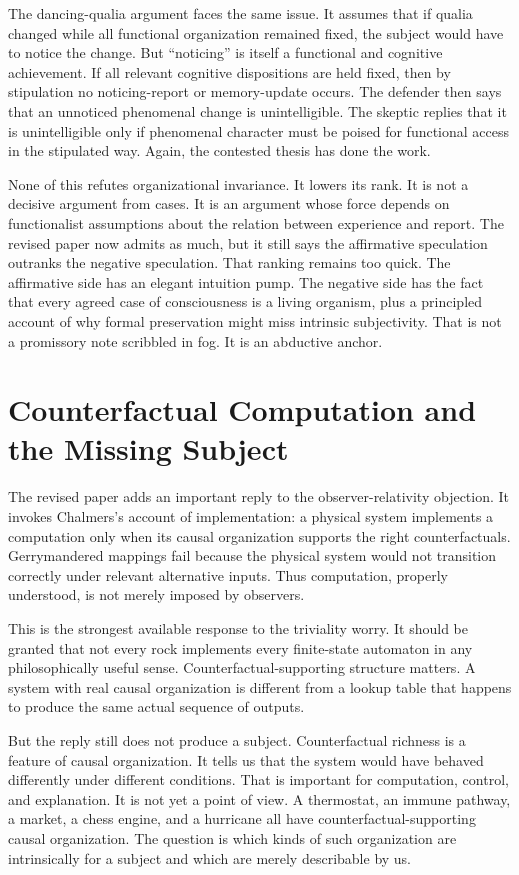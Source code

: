 \documentclass[11pt]{article}
\begin{document}
The dancing-qualia argument faces the same issue. It assumes that if qualia changed while all functional organization remained fixed, the subject would have to notice the change. But ``noticing'' is itself a functional and cognitive achievement. If all relevant cognitive dispositions are held fixed, then by stipulation no noticing-report or memory-update occurs. The defender then says that an unnoticed phenomenal change is unintelligible. The skeptic replies that it is unintelligible only if phenomenal character must be poised for functional access in the stipulated way. Again, the contested thesis has done the work.

None of this refutes organizational invariance. It lowers its rank. It is not a decisive argument from cases. It is an argument whose force depends on functionalist assumptions about the relation between experience and report. The revised paper now admits as much, but it still says the affirmative speculation outranks the negative speculation. That ranking remains too quick. The affirmative side has an elegant intuition pump. The negative side has the fact that every agreed case of consciousness is a living organism, plus a principled account of why formal preservation might miss intrinsic subjectivity. That is not a promissory note scribbled in fog. It is an abductive anchor.

\section{Counterfactual Computation and the Missing Subject}

The revised paper adds an important reply to the observer-relativity objection. It invokes Chalmers's account of implementation: a physical system implements a computation only when its causal organization supports the right counterfactuals. Gerrymandered mappings fail because the physical system would not transition correctly under relevant alternative inputs. Thus computation, properly understood, is not merely imposed by observers.

This is the strongest available response to the triviality worry. It should be granted that not every rock implements every finite-state automaton in any philosophically useful sense. Counterfactual-supporting structure matters. A system with real causal organization is different from a lookup table that happens to produce the same actual sequence of outputs.

But the reply still does not produce a subject. Counterfactual richness is a feature of causal organization. It tells us that the system would have behaved differently under different conditions. That is important for computation, control, and explanation. It is not yet a point of view. A thermostat, an immune pathway, a market, a chess engine, and a hurricane all have counterfactual-supporting causal organization. The question is which kinds of such organization are intrinsically for a subject and which are merely describable by us.
\end{document}
